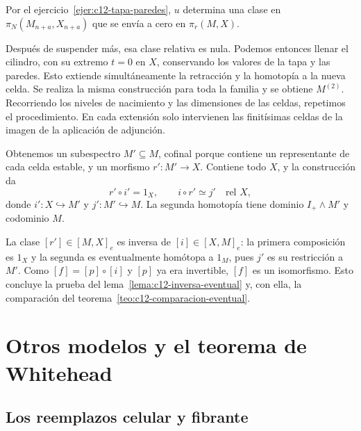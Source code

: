 Por el ejercicio~\ref{ejer:c12-tapa-paredes}, $u$ determina una clase en $\pi_N(M_{n+a},X_{n+a})$ que se envía a cero en $\pi_r(M,X)$.

Después de suspender más, esa clase relativa es nula. Podemos entonces llenar el cilindro, con su extremo $t=0$ en $X$, conservando los valores de la tapa y las paredes. Esto extiende simultáneamente la retracción y la homotopía a la nueva celda. Se realiza la misma construcción para toda la familia y se obtiene $M^{(2)}$. Recorriendo los niveles de nacimiento y las dimensiones de las celdas, repetimos el procedimiento. En cada extensión solo intervienen las finitísimas celdas de la imagen de la aplicación de adjunción.

Obtenemos un subespectro $M'\subseteq M$, cofinal porque contiene un representante de cada celda estable, y un morfismo $r'\colon M'\to X$. Contiene todo $X$, y la construcción da
\[
r'\circ i'=1_X,\qquad i\circ r'\simeq j'\quad\text{rel }X,
\]
donde $i'\colon X\hookrightarrow M'$ y $j'\colon M'\hookrightarrow M$. La segunda homotopía tiene dominio $I_+\wedge M'$ y codominio $M$.

La clase $[r']\in[M,X]_e$ es inversa de $[i]\in[X,M]_e$: la primera composición es $1_X$ y la segunda es eventualmente homótopa a $1_M$, pues $j'$ es su restricción a $M'$. Como $[f]=[p]\circ[i]$ y $[p]$ ya era invertible, $[f]$ es un isomorfismo. Esto concluye la prueba del lema~\ref{lema:c12-inversa-eventual} y, con ella, la comparación del teorema~\ref{teo:c12-comparacion-eventual}.

\section{Otros modelos y el teorema de Whitehead}

\subsection{Los reemplazos celular y fibrante}

